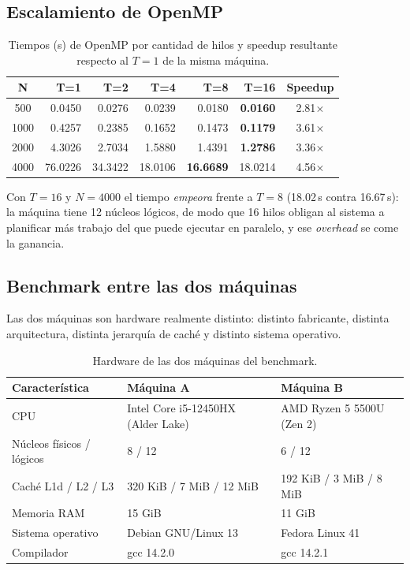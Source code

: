\subsection{Escalamiento de OpenMP}

\begin{table}[ht]
\centering
\begin{tabular}{|c|r|r|r|r|r|c|}
\hline
\textbf{N} & \textbf{T=1} & \textbf{T=2} & \textbf{T=4} & \textbf{T=8} & \textbf{T=16} & \textbf{Speedup} \\
\hline
500  & 0.0450 & 0.0276 & 0.0239 & 0.0180 & \textbf{0.0160} & 2.81$\times$ \\
1000 & 0.4257 & 0.2385 & 0.1652 & 0.1473 & \textbf{0.1179} & 3.61$\times$ \\
2000 & 4.3026 & 2.7034 & 1.5880 & 1.4391 & \textbf{1.2786} & 3.36$\times$ \\
4000 & 76.0226 & 34.3422 & 18.0106 & \textbf{16.6689} & 18.0214 & 4.56$\times$ \\
\hline
\end{tabular}
\caption{Tiempos (s) de OpenMP por cantidad de hilos y speedup resultante respecto al $T=1$ de la misma máquina.}
\label{tab:escalamiento}
\end{table}

Con $T=16$ y $N=4000$ el tiempo \emph{empeora} frente a $T=8$ (18.02\,s contra 16.67\,s): la máquina tiene 12 núcleos lógicos, de modo que 16 hilos obligan al sistema a planificar más trabajo del que puede ejecutar en paralelo, y ese \emph{overhead} se come la ganancia.

\subsection{Benchmark entre las dos máquinas}

Las dos máquinas son hardware realmente distinto: distinto fabricante, distinta arquitectura, distinta jerarquía de caché y distinto sistema operativo.

\begin{table}[ht]
\centering
\small
\begin{tabular}{|l|l|l|}
\hline
\textbf{Característica} & \textbf{Máquina A} & \textbf{Máquina B} \\
\hline
CPU & Intel Core i5-12450HX (Alder Lake) & AMD Ryzen 5 5500U (Zen 2) \\
Núcleos físicos / lógicos & 8 / 12 & 6 / 12 \\
Caché L1d / L2 / L3 & 320 KiB / 7 MiB / 12 MiB & 192 KiB / 3 MiB / 8 MiB \\
Memoria RAM & 15 GiB & 11 GiB \\
Sistema operativo & Debian GNU/Linux 13 & Fedora Linux 41 \\
Compilador & gcc 14.2.0 & gcc 14.2.1 \\
\hline
\end{tabular}
\caption{Hardware de las dos máquinas del benchmark.}
\label{tab:hardware}
\end{table}

